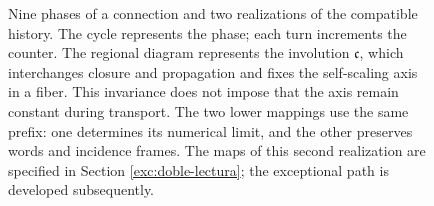 \begin{figure}[H]
\caption{\fontsize{9}{11}\selectfont Nine phases of a connection and two realizations of the compatible
history. The cycle represents the phase; each turn increments the counter.
The regional diagram represents the involution \(\mathfrak c\), which
interchanges closure and propagation and fixes the self-scaling axis in a fiber.
This invariance does not impose that the axis remain constant during transport.
The two lower mappings use the same prefix: one determines its numerical
limit, and the other preserves words and incidence frames. The maps of this
second realization are specified in Section \ref{exc:doble-lectura}; the
exceptional path is developed subsequently.}
\label{mono-ampl:fig-regional}
\end{figure}
